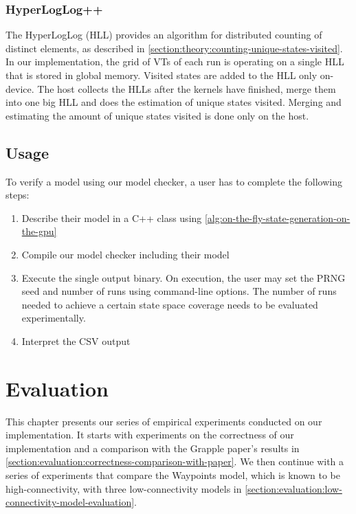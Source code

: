 \documentclass[
fancyheadings, %
%
%
]{stsreprt}
\begin{document}
\subsection{HyperLogLog++}

The HyperLogLog (HLL) provides an algorithm for distributed counting of distinct elements, as described in \cref{section:theory:counting-unique-states-visited}.
In our implementation, the grid of VTs of each run is operating on a single HLL that is stored in global memory.
Visited states are added to the HLL only on-device.
The host collects the HLLs after the kernels have finished, merge them into one big HLL and does the estimation of unique states visited.
Merging and estimating the amount of unique states visited is done only on the host.

\section{Usage}
\label{section:implementation:usage}

To verify a model using our model checker, a user has to complete the following steps:

\begin{enumerate}
    \item Describe their model in a C++ class using \cref{alg:on-the-fly-state-generation-on-the-gpu}
    \item Compile our model checker including their model
    \item Execute the single output binary.
          On execution, the user may set the PRNG seed and number of runs using command-line options.
          The number of runs needed to achieve a certain state space coverage needs to be evaluated experimentally.
    \item Interpret the CSV output
\end{enumerate}

\chapter{Evaluation}

This chapter presents our series of empirical experiments conducted on our implementation.
It starts with experiments on the correctness of our implementation and a comparison with the Grapple paper's results in \cref{section:evaluation:correctness-comparison-with-paper}.
We then continue with a series of experiments that compare the Waypoints model, which is known to be high-connectivity, with three low-connectivity models in \cref{section:evaluation:low-connectivity-model-evaluation}.
\end{document}

